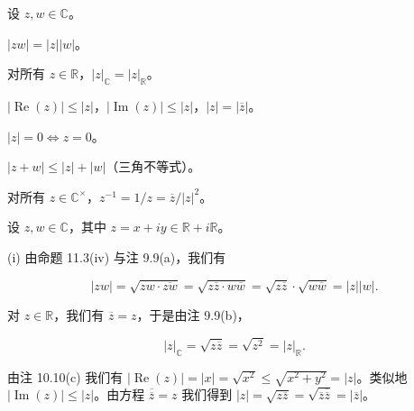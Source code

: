 \begin{proposition}

设 $ z, w \in \mathbb{C} $。

\begin{subitems}
\item

$ |zw| = |z| |w| $。

\item

对所有 $ z \in \mathbb{R} $，$ |z|_{\mathbb{C}} = |z|_{\mathbb{R}} $。

\item

$ |\operatorname{Re}(z)| \leq |z| $，$ |\operatorname{Im}(z)| \leq |z| $，$ |z| = |\overline{z}| $。

\item

$ |z| = 0 \Leftrightarrow z = 0 $。

\item

$ |z + w| \leq |z| + |w| $（三角不等式）。

\item

对所有 $ z \in \mathbb{C}^\times $，$ z^{-1} = 1/z = \overline{z}/|z|^2 $。

\proofhead
设 $ z, w \in \mathbb{C} $，其中 $ z = x + iy \in \mathbb{R} + i\mathbb{R} $。
\end{subitems}

(i) 由命题 11.3(iv) 与注 9.9(a)，我们有

\[
|z w|=\sqrt{z w\cdot\overline{{z w}}}=\sqrt{z\overline{{z}}\cdot w\overline{{w}}}=\sqrt{z\overline{{z}}}\cdot\sqrt{w\overline{{w}}}=\left|z\right|\left|w\right|.
\]

\begin{subitems}
\item[（ii）]

对 $ z \in \mathbb{R} $，我们有 $ \overline{z} = z $，于是由注 9.9(b)，

\[
|z|_{\mathbb{C}}=\sqrt{z\overline{{z}}}=\sqrt{z^{2}}=|z|_{\mathbb{R}}.
\]
\item[（iii）]

由注 10.10(c) 我们有 $ |\operatorname{Re}(z)| = |x| = \sqrt{x^2} \leq \sqrt{x^2 + y^2} = |z| $。类似地 $ |\operatorname{Im}(z)| \leq |z| $。由方程 $ \overline{\overline{z}} = z $ 我们得到 $ |z| = \sqrt{z\overline{z}} = \sqrt{\overline{z}\overline{\overline{z}}} = |\overline{z}| $。

\item[（iv）]


\end{subitems}
\end{proposition}
